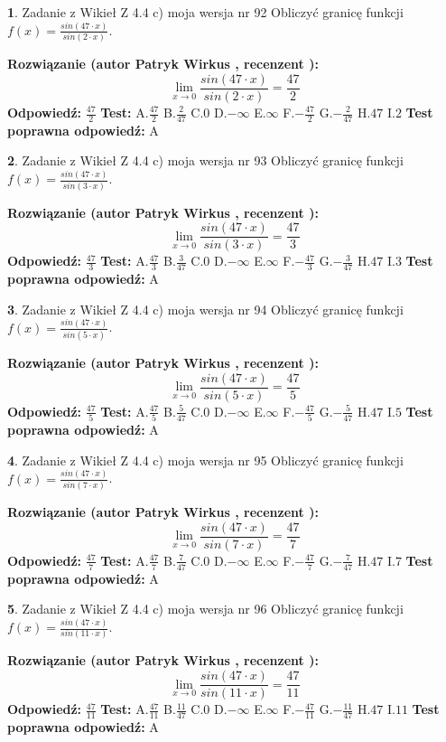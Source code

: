 \documentclass[12pt, a4paper]{article}
\theoremstyle{definition} %
\newtheorem{zad}{}
\newcommand{\zadStart}[1]{\begin{zad}#1\newline}
\newcommand{\zadStop}{\end{zad}}
\newcommand{\rozwStart}[2]{\noindent \textbf{Rozwiązanie (autor #1 , recenzent #2): }\newline}
\newcommand{\rozwStop}{\newline}
\newcommand{\odpStart}{\noindent \textbf{Odpowiedź:}\newline}
\newcommand{\odpStop}{\newline}
\newcommand{\testStart}{\noindent \textbf{Test:}\newline}
\newcommand{\testStop}{\newline}
\newcommand{\kluczStart}{\noindent \textbf{Test poprawna odpowiedź:}\newline}
\newcommand{\kluczStop}{\newline}
\begin{document}
\zadStart{Zadanie z Wikieł Z 4.4 c) moja wersja nr 92}
Obliczyć granicę funkcji $f(x)=\frac{sin(47\cdot x)}{sin(2\cdot x)}$.
\zadStop
\rozwStart{Patryk Wirkus}{}
$$\lim\limits_{x\to 0}\frac{sin(47\cdot x)}{sin(2\cdot x)}=
\frac{47}{2}$$
\rozwStop
\odpStart
$\frac{47}{2}$
\odpStop
\testStart
A.$\frac{47}{2}$
B.$\frac{2}{47}$
C.$0$
D.$-\infty$
E.$\infty$
F.$-\frac{47}{2}$
G.$-\frac{2}{47}$
H.$47$
I.$2$
\testStop
\kluczStart
A
\kluczStop



\zadStart{Zadanie z Wikieł Z 4.4 c) moja wersja nr 93}
Obliczyć granicę funkcji $f(x)=\frac{sin(47\cdot x)}{sin(3\cdot x)}$.
\zadStop
\rozwStart{Patryk Wirkus}{}
$$\lim\limits_{x\to 0}\frac{sin(47\cdot x)}{sin(3\cdot x)}=
\frac{47}{3}$$
\rozwStop
\odpStart
$\frac{47}{3}$
\odpStop
\testStart
A.$\frac{47}{3}$
B.$\frac{3}{47}$
C.$0$
D.$-\infty$
E.$\infty$
F.$-\frac{47}{3}$
G.$-\frac{3}{47}$
H.$47$
I.$3$
\testStop
\kluczStart
A
\kluczStop



\zadStart{Zadanie z Wikieł Z 4.4 c) moja wersja nr 94}
Obliczyć granicę funkcji $f(x)=\frac{sin(47\cdot x)}{sin(5\cdot x)}$.
\zadStop
\rozwStart{Patryk Wirkus}{}
$$\lim\limits_{x\to 0}\frac{sin(47\cdot x)}{sin(5\cdot x)}=
\frac{47}{5}$$
\rozwStop
\odpStart
$\frac{47}{5}$
\odpStop
\testStart
A.$\frac{47}{5}$
B.$\frac{5}{47}$
C.$0$
D.$-\infty$
E.$\infty$
F.$-\frac{47}{5}$
G.$-\frac{5}{47}$
H.$47$
I.$5$
\testStop
\kluczStart
A
\kluczStop



\zadStart{Zadanie z Wikieł Z 4.4 c) moja wersja nr 95}
Obliczyć granicę funkcji $f(x)=\frac{sin(47\cdot x)}{sin(7\cdot x)}$.
\zadStop
\rozwStart{Patryk Wirkus}{}
$$\lim\limits_{x\to 0}\frac{sin(47\cdot x)}{sin(7\cdot x)}=
\frac{47}{7}$$
\rozwStop
\odpStart
$\frac{47}{7}$
\odpStop
\testStart
A.$\frac{47}{7}$
B.$\frac{7}{47}$
C.$0$
D.$-\infty$
E.$\infty$
F.$-\frac{47}{7}$
G.$-\frac{7}{47}$
H.$47$
I.$7$
\testStop
\kluczStart
A
\kluczStop



\zadStart{Zadanie z Wikieł Z 4.4 c) moja wersja nr 96}
Obliczyć granicę funkcji $f(x)=\frac{sin(47\cdot x)}{sin(11\cdot x)}$.
\zadStop
\rozwStart{Patryk Wirkus}{}
$$\lim\limits_{x\to 0}\frac{sin(47\cdot x)}{sin(11\cdot x)}=
\frac{47}{11}$$
\rozwStop
\odpStart
$\frac{47}{11}$
\odpStop
\testStart
A.$\frac{47}{11}$
B.$\frac{11}{47}$
C.$0$
D.$-\infty$
E.$\infty$
F.$-\frac{47}{11}$
G.$-\frac{11}{47}$
H.$47$
I.$11$
\testStop
\kluczStart
A
\kluczStop
\end{document}
